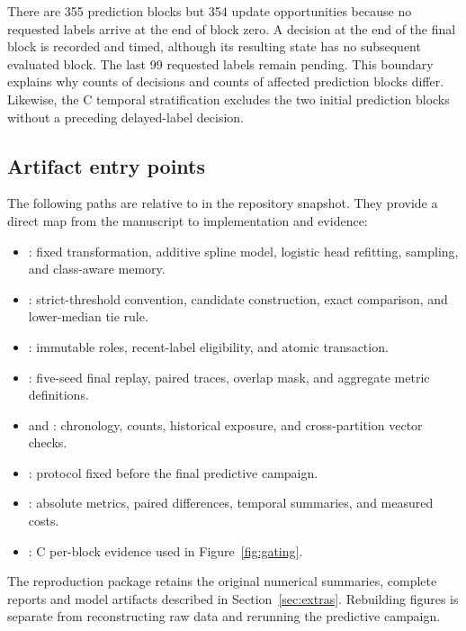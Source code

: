 There are 355 prediction blocks but 354 update opportunities because no requested labels arrive at the end of block zero. A decision at the end of the final block is recorded and timed, although its resulting state has no subsequent evaluated block. The last 99 requested labels remain pending. This boundary explains why counts of decisions and counts of affected prediction blocks differ. Likewise, the C temporal stratification excludes the two initial prediction blocks without a preceding delayed-label decision.

\subsection{Artifact entry points}
The following paths are relative to  in the repository snapshot. They provide a direct map from the manuscript to implementation and evidence:
\begin{itemize}\raggedright
\item {}: fixed transformation, additive spline model, logistic head refitting, sampling, and class-aware memory.
\item {}: strict-threshold convention, candidate construction, exact comparison, and lower-median tie rule.
\item {}: immutable roles, recent-label eligibility, and atomic transaction.
\item {}: five-seed final replay, paired traces, overlap mask, and aggregate metric definitions.
\item {} and : chronology, counts, historical exposure, and cross-partition vector checks.
\item {}: protocol fixed before the final predictive campaign.
\item {}: absolute metrics, paired differences, temporal summaries, and measured costs.
\item {}: C per-block evidence used in Figure~\ref{fig:gating}.
\end{itemize}
The reproduction package retains the original numerical summaries, complete reports and model artifacts described in Section~\ref{sec:extras}. Rebuilding figures is separate from reconstructing raw data and rerunning the predictive campaign.

